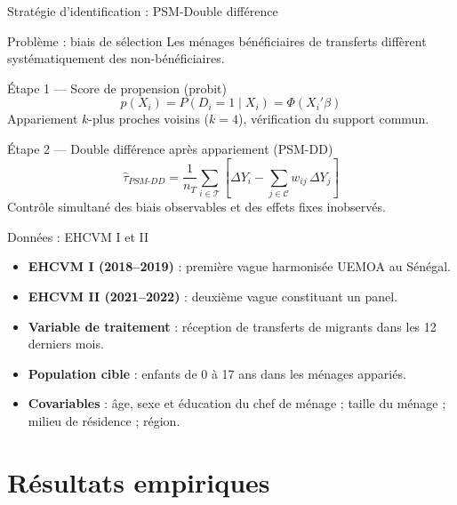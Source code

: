 \documentclass[10pt,aspectratio=169]{beamer}
\begin{document}
\begin{frame}{Stratégie d'identification : PSM-Double différence}
  \begin{block}{Problème : biais de sélection}
    Les ménages bénéficiaires de transferts diffèrent systématiquement des non-bénéficiaires.
  \end{block}
  \begin{block}{Étape 1 --- Score de propension (probit)}
    \begin{equation*}
      p(X_i) = P(D_i = 1 \mid X_i) = \Phi(X_i'\beta)
    \end{equation*}
    Appariement $k$-plus proches voisins ($k=4$), vérification du support commun.
  \end{block}
  \begin{alertblock}{Étape 2 --- Double différence après appariement (PSM-DD)}
    \begin{equation*}
      \hat{\tau}_{PSM\text{-}DD}
      = \frac{1}{n_T}\sum_{i\in\mathcal{T}}
        \!\left[\Delta Y_i - \sum_{j\in\mathcal{C}} w_{ij}\,\Delta Y_j\right]
    \end{equation*}
    Contrôle simultané des biais observables et des effets fixes inobservés.
  \end{alertblock}
\end{frame}

\begin{frame}{Données : EHCVM I et II}
  \begin{itemize}
    \item \textbf{EHCVM I (2018--2019)} : première vague harmonisée UEMOA au Sénégal.
    \item \textbf{EHCVM II (2021--2022)} : deuxième vague constituant un panel.
    \item \textbf{Variable de traitement} : réception de transferts de migrants dans les 12 derniers mois.
    \item \textbf{Population cible} : enfants de 0 à 17 ans dans les ménages appariés.
    \item \textbf{Covariables} : âge, sexe et éducation du chef de ménage ; taille du ménage ; milieu de résidence ; région.
  \end{itemize}
\end{frame}

\section[Résultats]{Résultats empiriques}
\end{document}

